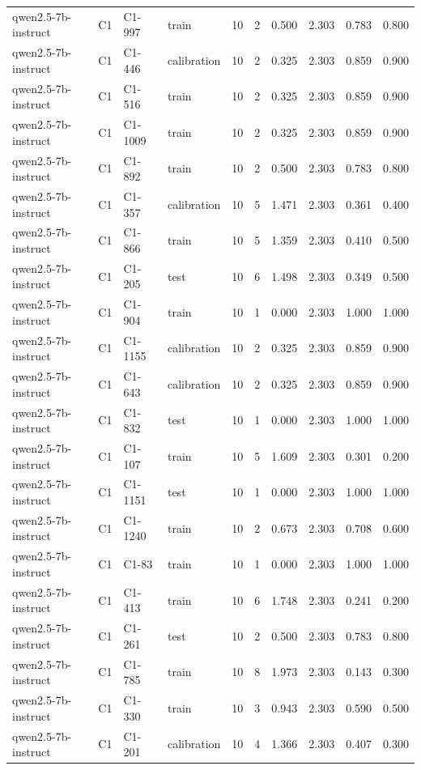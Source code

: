 \begin{table}
\begin{tabular}{llllrrrrrr}
qwen2.5-7b-instruct & C1 & C1-997 & train & 10 & 2 & 0.500 & 2.303 & 0.783 & 0.800 \\
qwen2.5-7b-instruct & C1 & C1-446 & calibration & 10 & 2 & 0.325 & 2.303 & 0.859 & 0.900 \\
qwen2.5-7b-instruct & C1 & C1-516 & train & 10 & 2 & 0.325 & 2.303 & 0.859 & 0.900 \\
qwen2.5-7b-instruct & C1 & C1-1009 & train & 10 & 2 & 0.325 & 2.303 & 0.859 & 0.900 \\
qwen2.5-7b-instruct & C1 & C1-892 & train & 10 & 2 & 0.500 & 2.303 & 0.783 & 0.800 \\
qwen2.5-7b-instruct & C1 & C1-357 & calibration & 10 & 5 & 1.471 & 2.303 & 0.361 & 0.400 \\
qwen2.5-7b-instruct & C1 & C1-866 & train & 10 & 5 & 1.359 & 2.303 & 0.410 & 0.500 \\
qwen2.5-7b-instruct & C1 & C1-205 & test & 10 & 6 & 1.498 & 2.303 & 0.349 & 0.500 \\
qwen2.5-7b-instruct & C1 & C1-904 & train & 10 & 1 & 0.000 & 2.303 & 1.000 & 1.000 \\
qwen2.5-7b-instruct & C1 & C1-1155 & calibration & 10 & 2 & 0.325 & 2.303 & 0.859 & 0.900 \\
qwen2.5-7b-instruct & C1 & C1-643 & calibration & 10 & 2 & 0.325 & 2.303 & 0.859 & 0.900 \\
qwen2.5-7b-instruct & C1 & C1-832 & test & 10 & 1 & 0.000 & 2.303 & 1.000 & 1.000 \\
qwen2.5-7b-instruct & C1 & C1-107 & train & 10 & 5 & 1.609 & 2.303 & 0.301 & 0.200 \\
qwen2.5-7b-instruct & C1 & C1-1151 & test & 10 & 1 & 0.000 & 2.303 & 1.000 & 1.000 \\
qwen2.5-7b-instruct & C1 & C1-1240 & train & 10 & 2 & 0.673 & 2.303 & 0.708 & 0.600 \\
qwen2.5-7b-instruct & C1 & C1-83 & train & 10 & 1 & 0.000 & 2.303 & 1.000 & 1.000 \\
qwen2.5-7b-instruct & C1 & C1-413 & train & 10 & 6 & 1.748 & 2.303 & 0.241 & 0.200 \\
qwen2.5-7b-instruct & C1 & C1-261 & test & 10 & 2 & 0.500 & 2.303 & 0.783 & 0.800 \\
qwen2.5-7b-instruct & C1 & C1-785 & train & 10 & 8 & 1.973 & 2.303 & 0.143 & 0.300 \\
qwen2.5-7b-instruct & C1 & C1-330 & train & 10 & 3 & 0.943 & 2.303 & 0.590 & 0.500 \\
qwen2.5-7b-instruct & C1 & C1-201 & calibration & 10 & 4 & 1.366 & 2.303 & 0.407 & 0.300 \\

\end{tabular}
\end{table}
